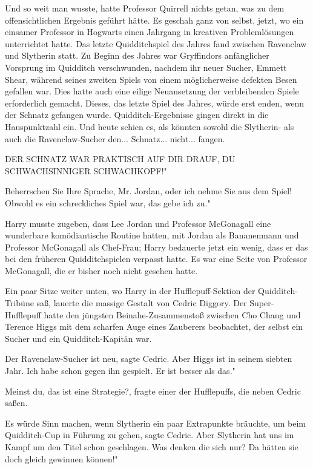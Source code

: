 Und so weit man wusste, hatte Professor Quirrell nichts getan, was zu dem
offensichtlichen Ergebnis geführt hätte. Es geschah ganz von selbst, jetzt, wo
ein einsamer Professor in Hogwarts einen Jahrgang in kreativen Problemlösungen
unterrichtet hatte. Das letzte Quidditchspiel des Jahres fand zwischen Ravenclaw
und Slytherin statt. Zu Beginn des Jahres war Gryffindors anfänglicher Vorsprung
im Quidditch verschwunden, nachdem ihr neuer Sucher, Emmett Shear, während
seines zweiten Spiels von einem möglicherweise defekten Besen gefallen war. Dies
hatte auch eine eilige Neuansetzung der verbleibenden Spiele erforderlich
gemacht. Dieses, das letzte Spiel des Jahres, würde erst enden, wenn der Schnatz
gefangen wurde. Quidditch-Ergebnisse gingen direkt in die Hauspunktzahl ein. Und
heute schien es, als könnten sowohl die Slytherin- als auch die Ravenclaw-Sucher
den... Schnatz... nicht... fangen.

\glqq DER SCHNATZ WAR PRAKTISCH AUF DIR DRAUF, DU SCHWACHSINNIGER SCHWACHKOPF!"

\glqq Beherrschen Sie Ihre Sprache, Mr. Jordan, oder ich nehme Sie aus dem
Spiel! Obwohl es ein schreckliches Spiel war, das gebe ich zu."

Harry musste zugeben, dass Lee Jordan und Professor McGonagall eine wunderbare
komödiantische Routine hatten, mit Jordan als Bananenmann und Professor
McGonagall als Chef-Frau; Harry bedauerte jetzt ein wenig, dass er das bei den
früheren Quidditchspielen verpasst hatte. Es war eine Seite von Professor
McGonagall, die er bisher noch nicht gesehen hatte.

Ein paar Sitze weiter unten, wo Harry in der Hufflepuff-Sektion der
Quidditch-Tribüne saß, lauerte die massige Gestalt von Cedric Diggory. Der
Super-Hufflepuff hatte den jüngsten Beinahe-Zusammenstoß zwischen Cho Chang und
Terence Higgs mit dem scharfen Auge eines Zauberers beobachtet, der selbst ein
Sucher und ein Quidditch-Kapitän war.

\glqq Der Ravenclaw-Sucher ist neu\grqq{}, sagte Cedric. \glqq Aber Higgs ist in
seinem siebten Jahr. Ich habe schon gegen ihn gespielt. Er ist besser als das."

\glqq Meinst du, das ist eine Strategie?\grqq{}, fragte einer der Hufflepuffs,
die neben Cedric saßen.

\glqq Es würde Sinn machen, wenn Slytherin ein paar Extrapunkte bräuchte, um
beim Quidditch-Cup in Führung zu gehen\grqq{}, sagte Cedric. \glqq Aber
Slytherin hat uns im Kampf um den Titel schon geschlagen. Was denken die sich
nur? Da hätten sie doch gleich gewinnen können!"

